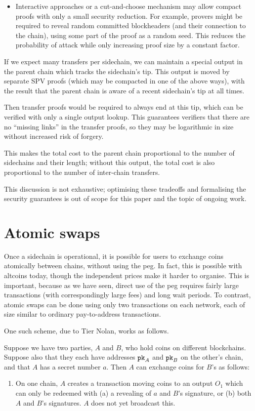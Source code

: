 \documentclass[letterpaper]{article}
\newcommand{\pk}{\textnormal{\texttt{pk}}}
\newcommand{\mainchain}{parent chain\xspace}
\newcommand{\sidechain}{sidechain\xspace}
\newcommand{\sidechains}{sidechains\xspace}
\newcommand{\altcoins}{altcoins\xspace}
\begin{document}
\begin{appendices}
\begin{itemize}
\item Interactive approaches or a cut-and-choose mechanism may allow
compact proofs with only a small security reduction. For example, provers
might be required to reveal random committed blockheaders (and their connection to
the chain), using some part of the proof as a random seed. This reduces the
probability of attack while only increasing proof size by a constant factor.
\end{itemize}

If we expect many transfers per \sidechain, we can maintain a special
output in the \mainchain which tracks the \sidechain's tip. This output is
moved by separate SPV proofs (which may be compacted in one of the above
ways), with the result that the \mainchain is aware of a recent \sidechain's
tip at all times.

Then transfer proofs would be required to always end at this tip, which can
be verified with only a single output lookup. This
guarantees verifiers that there are no ``missing links'' in the transfer
proofs, so they may be logarithmic in size without increased risk of forgery.

This makes the total cost to the \mainchain proportional to the number of
\sidechains and their length; without this output, the total cost is also
proportional to the number of inter-chain transfers.

This discussion is not exhaustive; optimising these tradeoffs and formalising the
security guarantees is out of scope for this paper and the topic of ongoing
work.

\section{Atomic swaps\label{atomicswaps}}

Once a \sidechain is operational, it is possible for users to exchange coins
atomically between chains, without using the peg. In fact, this is possible
with \altcoins today, though the independent prices make it harder to organise.
This is important, because as we have seen, direct use of the peg requires
fairly large transactions (with correspondingly large fees) and long wait periods. To contrast,
atomic swaps can be done using only two transactions on each network, each of
size similar to ordinary pay-to-address transactions.

One such scheme, due to Tier Nolan\cite{nolan2013}, works as follows.

Suppose we have two parties, $A$ and $B$, who hold coins on different blockchains.
Suppose also that they each have addresses $\pk_A$ and $\pk_B$ on the other's
chain, and that $A$ has a secret number $a$. Then $A$ can
exchange coins for $B$'s as follows:
\begin{enumerate}
\item On one chain, $A$ creates a transaction moving coins to an output $O_1$
which can only be redeemed with (a) a revealing of $a$ and $B$'s signature, or (b)
both $A$ and $B$'s signatures. $A$ does not yet broadcast this.


\end{enumerate}
\end{appendices}
\end{document}
